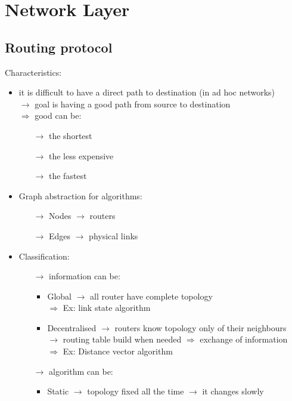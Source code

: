 \section{Network Layer}
\subsection{Routing protocol}
Characteristics:
\begin{itemize}
    \item it is difficult to have a direct path to destination (in ad hoc networks)\\
    $\rightarrow$ goal is having a good path from source to destination\\
    $\Rightarrow$ good can be:
    \begin{itemize}
        \item[$\rightarrow$] the shortest
        \item[$\rightarrow$] the less expensive
        \item[$\rightarrow$] the fastest
    \end{itemize}
    \item Graph abstraction for algorithms:
    \begin{itemize}
        \item[$\rightarrow$] Nodes $\rightarrow$ routers
        \item[$\rightarrow$] Edges $\rightarrow$ physical links
    \end{itemize}
    \item Classification:
    \begin{itemize}
        \item[$\rightarrow$] information can be:
        \begin{itemize}
            \item Global $\rightarrow$ all router have complete topology\\
            $\Rightarrow$ Ex: link state algorithm
            \item Decentralised $\rightarrow$ routers know topology only of their neighbours\\
            $\rightarrow$ routing table build when needed $\Rightarrow$ exchange of information\\
            $\Rightarrow$ Ex: Distance vector algorithm
        \end{itemize} 
        \item[$\rightarrow$] algorithm can be:
        \begin{itemize}
            \item Static $\rightarrow$ topology fixed all the time $\rightarrow$ it changes slowly

\end{itemize}
\end{itemize}
\end{itemize}
